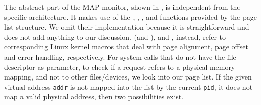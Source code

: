 The abstract part of the MAP monitor, shown in , is independent from the specific architecture.
It makes use of the , , ,  and 
functions provided by the page list structure. We omit their implementation because it is straightforward and does not add anything to our discussion.
 (and ),  and , instead, refer to corresponding Linux kernel macros that deal with
page alignment, page offset and error handling, respectively.
For system calls that do not have the file descriptor as parameter, to check if a request refers to a physical memory mapping, and not to other files/devices,
we look into our page list. If the given virtual address \verb|addr| is not mapped into the list by the current \verb|pid|, \ie it does not map a valid physical address,
then two possibilities exist.
